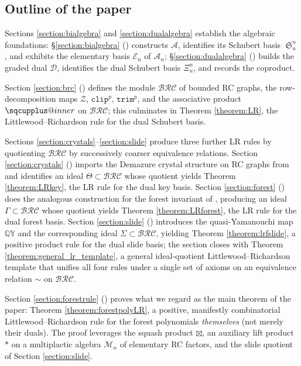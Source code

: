 \documentclass{amsart}
\makeatletter
\newcommand{\sqcupplus@inner}[2]{%
  \vcenter{\hbox{\ooalign{%
    \hfil$\m@th#1\sqcup$\hfil\cr
    \hfil\raisebox{0.15ex}{$\m@th#1\scriptscriptstyle+$}\hfil\cr
  }}}%
}
\newcommand{\sqcupplus}{\mathbin{\mathpalette\sqcupplus@inner\relax}}
\theoremstyle{definition}
\theoremstyle{remark}
\numberwithin{equation}{subsection}
\DeclareMathOperator{\sch}{\mathfrak{S}}
\newcommand{\QY}{\ensuremath{\mathbb{QY}}}
\newcommand{\trm}{\mathtt{trim}}
\newcommand{\zeromap}{\mathcal{Z}}
\newcommand{\clp}{\mathtt{clip}}
\newcommand{\BRC}{\mathcal{BRC}}
\newcommand{\dsch}{\ensuremath{\Xi}}
\newcommand{\coma}{\mathcal{A}}
\newcommand{\dcoma}{\mathcal{D}}
\makeatother
\begin{document}
\subsection*{Outline of the paper}

Sections \ref{section:bialgebra} and \ref{section:dualalgebra} establish the algebraic foundations: \S\ref{section:bialgebra} () constructs $\coma$, identifies its Schubert basis $\sch_u^n$, and exhibits the elementary basis $\mathcal{E}_n$ of $\coma_n$; \S\ref{section:dualalgebra} () builds the graded dual $\dcoma$, identifies the dual Schubert basis $\dsch_u^n$, and records the coproduct.

Section \ref{section:brc} () defines the module $\BRC$ of bounded RC graphs, the row-decomposition maps $\zeromap$, $\clp^p$, $\trm^p$, and the associative product $\sqcupplus$ on $\BRC$; this culminates in Theorem \ref{theorem:LR}, the Littlewood--Richardson rule for the dual Schubert basis.

Sections \ref{section:crystals}--\ref{section:slide} produce three further LR rules by quotienting $\BRC$ by successively coarser equivalence relations. Section \ref{section:crystals} () imports the Demazure crystal structure on RC graphs from \cite{assaf2018demazure} and identifies an ideal $\Theta\subset\BRC$ whose quotient yields Theorem \ref{theorem:LRkey}, the LR rule for the dual key basis. Section \ref{section:forest} () does the analogous construction for the forest invariant of \cite{nadeau2024forest}, producing an ideal $\Gamma\subset\BRC$ whose quotient yields Theorem \ref{theorem:LRforest}, the LR rule for the dual forest basis. Section \ref{section:slide} () introduces the quasi-Yamanouchi map $\QY$ and the corresponding ideal $\Sigma\subset\BRC$, yielding Theorem \ref{theorem:lrfslide}, a positive product rule for the dual slide basis; the section closes with Theorem \ref{theorem:general_lr_template}, a general ideal-quotient Littlewood--Richardson template that unifies all four rules under a single set of axioms on an equivalence relation $\sim$ on $\BRC$.

Section \ref{section:forestrule} () proves what we regard as the main theorem of the paper: Theorem \ref{theorem:forestpolyLR}, a positive, manifestly combinatorial Littlewood--Richardson rule for the forest polynomials \emph{themselves} (not merely their duals). The proof leverages the squash product $\boxtimes$, an auxiliary lift product $*$ on a multiplactic algebra $\mathcal{M}_n$ of elementary RC factors, and the slide quotient of Section \ref{section:slide}.
\end{document}
